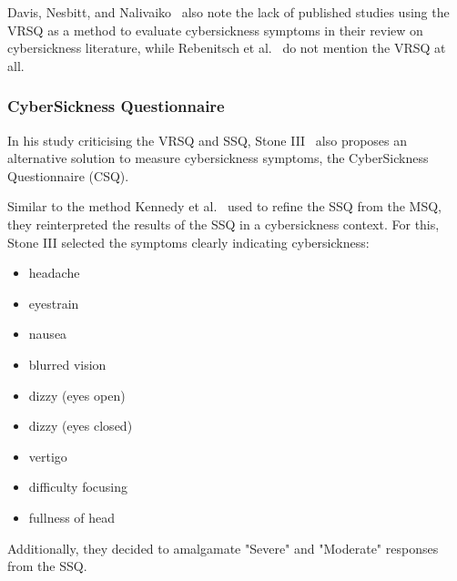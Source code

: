 Davis, Nesbitt, and Nalivaiko~\cite{Davis2014} also note the lack of published studies using the VRSQ as a method to
evaluate cybersickness symptoms in their review on cybersickness literature, while Rebenitsch et al.~\cite{Rebenitsch2016}
do not mention the VRSQ at all.


\subsubsection{CyberSickness Questionnaire}\label{subsubsec:cybersickness-questionnaire}

In his study criticising the VRSQ and SSQ, Stone III~\cite{Stone2017} also proposes an alternative solution to
measure cybersickness symptoms, the CyberSickness Questionnaire (CSQ).

Similar to the method Kennedy et al.\ \cite{Kennedy1993} used to refine the SSQ from the MSQ, they reinterpreted the
results of the SSQ in a cybersickness context.
For this, Stone III selected the symptoms clearly indicating cybersickness:
\begin{itemize}
    \item headache
    \item eyestrain
    \item nausea
    \item blurred vision
    \item dizzy (eyes open)
    \item dizzy (eyes closed)
    \item vertigo
    \item difficulty focusing
    \item fullness of head
\end{itemize}
Additionally, they decided to amalgamate "Severe" and "Moderate" responses from the SSQ\@.

